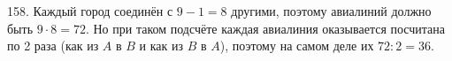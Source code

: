 158. Каждый город соединён с $9-1=8$ другими, поэтому авиалиний должно быть $9\cdot8=72.$ Но при таком подсчёте каждая авиалиния оказывается посчитана по 2 раза (как из $A$ в $B$ и как из $B$ в $A$), поэтому на самом деле их $72:2=36.$\\
